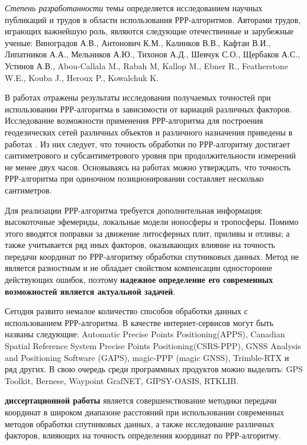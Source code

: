 {\progress}
\textit{Степень разработанности} темы определяется исследованием научных публикаций и трудов в области использования РРР-алгоритмов. Авторами трудов, играющих важнейшую роль, являются следующие отечественные и зарубежные ученые: Виноградов А.В., Антонович К.М., Калинков В.В., Кафтан В.И., Липатников А.А., Мельников А.Ю., Тихонов А.Д., Шевчук С.О., Щербаков А.С., Устинов А.В., Abou-Callala M., Rabah M, Kallop M., Ebner R., Featherstone W.E., Kouba J., Heroux P., Kowalchuk K.

В работах \cite{mak01,mak02} отражены результаты исследования получаемых точностей при использовании РРР-алгоритма в зависимости от вариаций различных факторов. Исследование возможности применения РРР-алгоритма для построения геодезических сетей различных объектов и различного назначения приведены в работах \cite{mak03,mak09}. Из них следует, что точность обработки по РРР-алгоритму достигает сантиметрового и субсантиметрового уровня при продолжительности измерений не менее двух часов. Основываясь на работах \cite{mak05,mak08,src43,src44} можно утверждать, что точность РРР-алгоритма при одиночном позиционировании составляет несколько сантиметров.

Для реализации РРР-алгоритма требуется дополнительная информация: высокоточные эфемериды, локальные модели ионосферы и тропосферы. Помимо этого вводятся поправки за движение литосферных плит, приливы и отливы; а также учитывается ряд иных факторов, оказывающих влияние на точность передачи координат по РРР-алгоритму обработки спутниковых данных.  Метод не является разностным и не обладает свойством компенсации односторонне действующих ошибок, поэтому \textbf{надежное определение его современных возможностей является актуальной задачей}.

Сегодня развито немалое количество способов обработки данных с использованием РРР-алгоритма. В качестве интернет-сервисов могут быть названы следующие: Automatic Precise Points Positioning(APPS), Canadian Spatial Reference System Precise Points Positioning(CSRS-PPP), GNSS Analysis and Positioning Software (GAPS), magic-PPP (magic GNSS), Trimble-RTX и ряд других. В свою очередь среди программных продуктов можно выделить: GPS Toolkit, Bernese, Waypoint GrafNET, GIPSY-OASIS, RTKLIB. 

{\aim} \textbf{диссертационной работы} является совершенствование методики передачи координат в широком диапазоне расстояний при использовании современных методов обработки спутниковых данных, а также исследование различных факторов, влияющих на точность определения координат по РРР-алгоритму.

